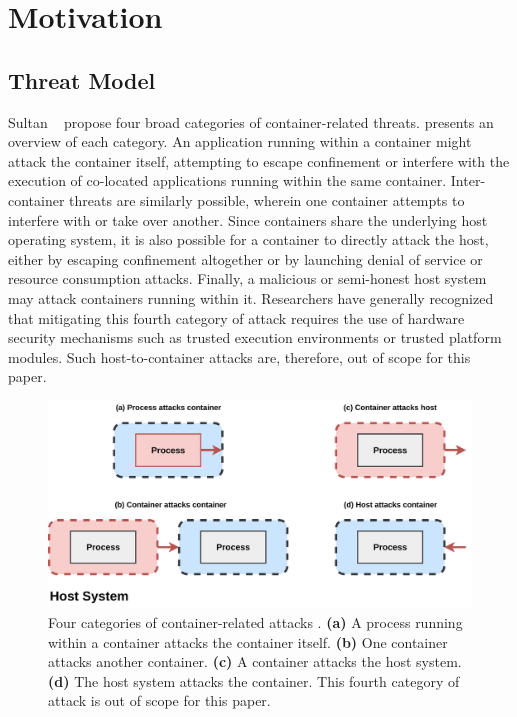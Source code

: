 \section{Motivation}
\label{sec:motivation}

\subsection{Threat Model}%
\label{sub:threat_model}

Sultan \etal~\cite{sultan2019_container_security} propose four broad categories of container-related threats.  presents an overview of each category. An application running within a container might attack the container itself, attempting to escape confinement or interfere with the execution of co-located applications running within the same container. Inter-container threats are similarly possible, wherein one container attempts to interfere with or take over another. Since containers share the underlying host operating system, it is also possible for a container to directly attack the host, either by escaping confinement altogether or by launching denial of service or resource consumption attacks. Finally, a malicious or semi-honest host system may attack containers running within it. Researchers have generally recognized that mitigating this fourth category of attack requires the use of hardware security mechanisms \cite{sultan2019_container_security}  such as trusted execution environments or trusted platform modules. Such host-to-container attacks are, therefore, out of scope for this paper.

\begin{figure}[htpb]
  \centering
  \includegraphics[width=0.8\linewidth]{figs/threat-model.pdf}
  \caption{
    Four categories of container-related attacks \cite{sultan2019_container_security}. \textbf{(a)} A process running within a container attacks the container itself. \textbf{(b)} One container attacks another container. \textbf{(c)} A container attacks the host system. \textbf{(d)} The host system attacks the container. This fourth category of attack is out of scope for this paper.
  }%
  \label{fig:threat_model}
\end{figure}

